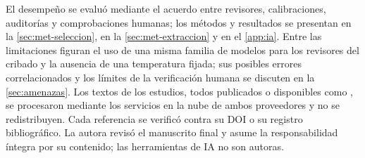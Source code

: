 El desempeño se evaluó mediante el acuerdo entre revisores, calibraciones, auditorías y comprobaciones humanas; los métodos y resultados se presentan en la \cref{sec:met-seleccion}, en la \cref{sec:met-extraccion} y en el \cref{app:ia}. Entre las limitaciones figuran el uso de una misma familia de modelos para los revisores del cribado y la ausencia de una temperatura fijada; sus posibles errores correlacionados y los límites de la verificación humana se discuten en la \cref{sec:amenazas}. Los textos de los estudios, todos publicados o disponibles como , se procesaron mediante los servicios en la nube de ambos proveedores y no se redistribuyen. Cada referencia se verificó contra su DOI o su registro bibliográfico. La autora revisó el manuscrito final y asume la responsabilidad íntegra por su contenido; las herramientas de IA no son autoras.
